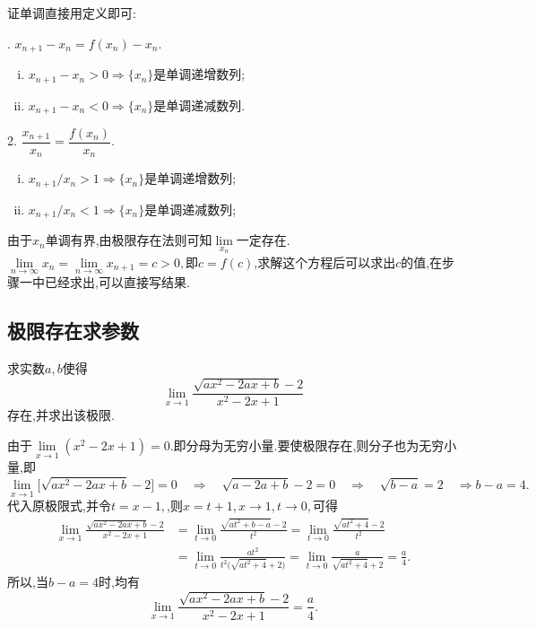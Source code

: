 \noindent {}

证单调直接用定义即可:\sj
\begin{multicols}{2}
.$\,\,x_{n+1}-x_n=f(x_n)-x_n$.
\begin{enumerate}[(i)]
	\item $x_{n+1}-x_n>0\Rightarrow\{x_n\}$是单调递增数列;
	\item $x_{n+1}-x_n<0\Rightarrow\{x_n\}$是单调递减数列.
\end{enumerate}
2.$\,\,\dfrac{x_{n+1}}{x_n}=\dfrac{f(x_n)}{x_n}$.
\begin{enumerate}[(i)]
	\item $x_{n+1}/x_n>1\Rightarrow \{x_n\}$是单调递增数列;
	\item $x_{n+1}/x_n<1\Rightarrow \{x_n\}$是单调递减数列;
\end{enumerate}
\end{multicols}
\sj
\warn
[
\kg 在有变号的数列中第二种方法不适用.
]
\jg

\noindent {}

由于$x_n$单调有界,由极限存在法则可知$\lim\limits_{x_n}$一定存在.$\lim\limits_{n \to \infty}x_n=\lim\limits_{n \to \infty}x_{n+1}=c>0,$即$c=f(c)$,求解这个方程后可以求出$c$的值,在步骤一中已经求出,可以直接写结果.
\warn
[
\kg $\lim\limits_{n \to \infty}x_n=\lim\limits_{n \to \infty}x_{n+1}=c$成立的前提条件是数列${x_n}$单调有界(或$\{x_n\}$收敛).
]

\subsection{极限存在求参数}
\texample[极限存在求参数]\sj

\examples 求实数$a,b$使得
\[
\lim\limits_{x \to 1}\frac{\sqrt{ax^2-2ax+b}-2}{x^2-2x+1}
\]
存在,并求出该极限.

\solve 由于$\lim\limits_{x \to 1}(x^2-2x+1)=0$.即分母为无穷小量.要使极限存在,则分子也为无穷小量,即
\[
\lim\limits_{x \to 1}\big[\sqrt{ax^2-2ax+b}-2\big]=0 \quad \Rightarrow \quad \sqrt{a-2a+b}-2=0 \quad \Rightarrow \quad \sqrt{b-a}=2 \quad \Rightarrow b-a=4.
\]
代入原极限式,并令$t=x-1,$,则$x=t+1,x\to1,t \to 0,$可得
\[
\begin{split}
\lim\limits_{x \to 1}\frac{\sqrt{ax^2-2ax+b}-2}{x^2-2x+1}&=\lim\limits_{t \to 0}\frac{\sqrt{at^2+b-a}-2}{t^2}=\lim\limits_{t \to 0}\frac{\sqrt{at^2+4}-2}{t^2}\\
&=\lim\limits_{t \to 0}\frac{at^2}{t^2\big(\sqrt{at^2+4}+2\big)}=\lim\limits_{t \to 0}\frac{a}{\sqrt{at^2+4}+2}=\frac{a}{4}.
\end{split}
\]
所以,当$b-a=4$时,均有
\[
\lim\limits_{x \to 1}\frac{\sqrt{ax^2-2ax+b}-2}{x^2-2x+1}=\frac a4.
\]

